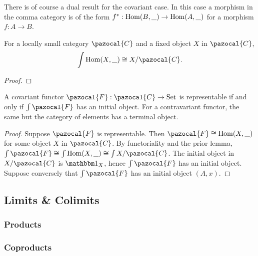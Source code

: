 \begin{remark}
    There is of course a dual result for the covariant case. In this case a morphism in the comma category is of the form $f^\ast : \mathrm{Hom}(B,\_)\rightarrow \mathrm{Hom}(A,\_)$ for a morphism $f: A \rightarrow B$. 
\end{remark}
\begin{lemma}
    For a locally small category $\pazocal{C}$ and a fixed object $X$ in $\pazocal{C}$, 
    $$\int \Hom(X,\_) \cong X/\pazocal{C}.$$
\end{lemma}
\begin{proof}
    
\end{proof}
\begin{proposition}
    A covariant functor $\pazocal{F} : \pazocal{C}\rightarrow \mathrm{Set}$ is representable if and only if $\int \pazocal{F}$ has an initial object. For a contravariant functor, the same but the category of elements has a terminal object.  
\end{proposition}
\begin{proof}
    Suppose $\pazocal{F}$ is representable. Then $\pazocal{F}\cong \Hom(X,\_)$ for some object $X$ in $\pazocal{C}$. By functoriality and the prior lemma, $\int \pazocal{F}\cong  \int \Hom(X,\_)\cong \int X/\pazocal{C}$. The initial object in $X/\pazocal{C}$ is $\fone_X$, hence $\int \pazocal{F}$ has an initial object.\\
    Suppose conversely that $\int\pazocal{F}$ has an initial object $(A,x)$. 
\end{proof}
\subsection{Limits \& Colimits}

\subsubsection{Products}
\subsubsection{Coproducts}